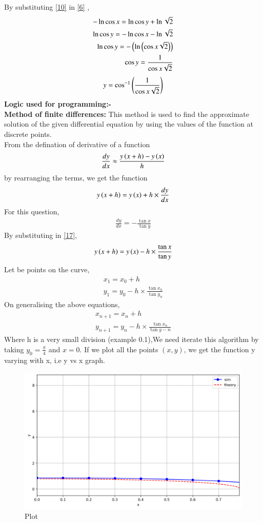 \documentclass[journal]{IEEEtran}
\begin{document}
By substituting \eqref{10} in \eqref{6} , 
\begin{align}
- \ln{\cos{x}} = \ln{\cos{y}} + \ln{\sqrt{2}} \\
\ln{\cos{y}} = - \ln{\cos{x}} - \ln{\sqrt{2}} \\
\ln{\cos{y}} = - \left(\ln{\ensuremath{\left(\cos{x}\sqrt{2}\right)}}\right) \\
\cos{y} = \frac{1}{\cos{x}\sqrt{2}} \label{14}
\end{align}
\begin{align}
    y = \cos^{-1}\left({\frac{1}{\cos{x}\sqrt{2}}}\right) \label{15}
\end{align}
\textbf{Logic used for programming:-} \\
\textbf{Method of finite differences:} This method is used to find the approximate solution of the given differential equation by using the values of the function at discrete points.  \\
From the defination of derivative of a function 
\begin{align}
\frac{dy}{dx} \approx \frac{y\left(x+h\right)-y\left(x\right)}{h} \label{11}
\end{align}
by rearranging the terms, we get the function
\begin{align}
y\left(x+h\right)=y\left(x\right)+h \times \frac{dy}{dx} \label{17}
\end{align}
For this question, 
\begin{align}
\frac{dy}{dx} = - \frac{\tan{x}}{\tan{y}}
\end{align}
By substituting in \eqref{17},
\begin{align}
y\left(x+h\right)=y\left(x\right) - h \times \frac{\tan{x}}{\tan{y}}
\end{align}
Let  be points on the curve,
\begin{align}
x_1=x_0+h \\
y_1=y_0 - h \times \frac{\tan{x_n}}{\tan{y_n}}
\end{align}
On  generalising the above equations,
\begin{align}
x_{n+1}=x_{n}+h \\
y_{n+1}=y_{n} - h \times \frac{\tan{x_n}}{\tan{y
-n}}
\end{align}
Where h is a very small division (example 0.1),We need iterate this algorithm by taking $y_0=\frac{\pi}{4}$ and $x=0$.
If we plot all the points $(x,y)$, we get the function y varying with x, i.e y vs x graph. \\


\begin{figure}[htbp] %
    \centering
    \includegraphics[width=\textwidth]{figs/plot.png} %
    \caption{Plot}
\end{figure}
\end{document}
